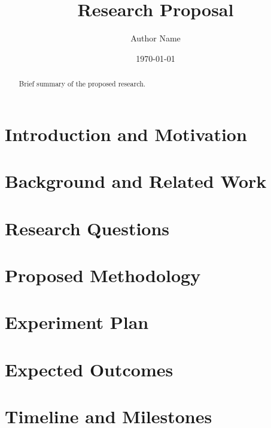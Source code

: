 \documentclass[11pt]{article}
\title{Research Proposal}
\author{Author Name}
\date{\today}
\begin{document}
\maketitle

\begin{abstract}
Brief summary of the proposed research.
\end{abstract}

\section{Introduction and Motivation}

\section{Background and Related Work}

\section{Research Questions}

\section{Proposed Methodology}

\section{Experiment Plan}

\section{Expected Outcomes}

\section{Timeline and Milestones}



\end{document}
